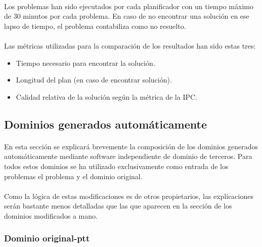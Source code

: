 \documentclass{article}
\begin{document}
\paragraph{}
Los problemas han sido ejecutados por cada planificador con un tiempo máximo de 30 minutos por cada problema. En caso de no encontrar una solución en ese lapso de tiempo, el problema contabiliza como no resuelto.

\paragraph{}
Las métricas utilizadas para la comparación de los resultados han sido estas tres:
\begin{itemize}
    \item Tiempo necesario para encontrar la solución.
    \item Longitud del plan (en caso de encontrar solución).
    \item Calidad relativa de la solución según la métrica de la IPC. 
\end{itemize}

\subsection{Dominios generados automáticamente}
\paragraph{}
En esta sección se explicará brevemente la composición de los dominios generados automáticamente mediante software independiente de dominio de terceros. Para todos estos dominios se ha utilizado exclusivamente como entrada de los problemas el problema y el dominio original.

\paragraph{}
Como la lógica de estas modificaciones es de otros propietarios, las explicaciones serán bastante menos detalladas que las que aparecen en la sección de los dominios modificados a mano.

\subsubsection{Dominio original-ptt}
\end{document}
